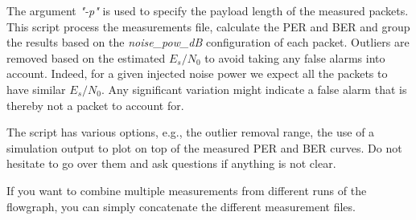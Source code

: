 The argument \textit{"-p"} is used to specify the payload length of the measured packets. This script process the measurements file, calculate the PER and BER and group the results based on the \textit{noise\_pow\_dB} configuration of each packet. Outliers are removed based on the estimated $E_s/N_0$ to avoid taking any false alarms into account. Indeed, for a given injected noise power we expect all the packets to have similar $E_s/N_0$. Any significant variation might indicate a false alarm that is thereby not a packet to account for.

The script has various options, e.g., the outlier removal range, the use of a simulation output to plot on top of the measured PER and BER curves. Do not hesitate to go over them and ask questions if anything is not clear.

If you want to combine multiple measurements from different runs of the flowgraph, you can simply concatenate the different measurement files.







